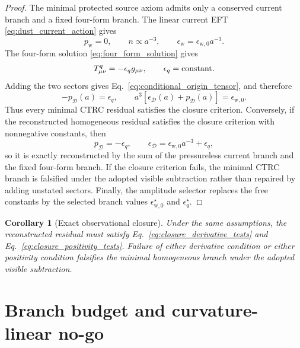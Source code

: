 \documentclass[
  aps,
  prd,
  reprint,
  superscriptaddress,
  floatfix,
  nofootinbib,
  longbibliography
]{revtex4-2}
\theoremstyle{plain}
\newtheorem{corollary}[theorem]{Corollary}
\theoremstyle{definition}
\theoremstyle{remark}
\newcommand{\D}{\mathcal D}
\newcommand{\w}{\mathrm w}
\newcommand{\eps}{\epsilon}
\begin{document}
\begin{proof}
The minimal protected source axiom admits only a conserved current branch and a
fixed four-form branch.  The linear current EFT
\eqref{eq:dust_current_action} gives
\begin{equation}
p_{\w}=0,
\qquad
n\propto a^{-3},
\qquad
\eps_{\w}=\eps_{\w,0}a^{-3}.
\end{equation}
The four-form solution \eqref{eq:four_form_solution} gives
\begin{equation}
T^q_{\mu\nu}=-\eps_q g_{\mu\nu},
\qquad
\eps_q=\hbox{constant}.
\end{equation}
Adding the two sectors gives Eq.~\eqref{eq:conditional_origin_tensor}, and
therefore
\begin{equation}
-p_\D(a)=\eps_q,
\qquad
a^3[\eps_\D(a)+p_\D(a)]=\eps_{\w,0}.
\end{equation}
Thus every minimal CTRC residual satisfies the closure criterion.
Conversely, if the reconstructed homogeneous residual satisfies the closure
criterion with nonnegative constants, then
\begin{equation}
p_\D=-\eps_q,
\qquad
\eps_\D=\eps_{\w,0}a^{-3}+\eps_q,
\end{equation}
so it is exactly reconstructed by the sum of the pressureless current branch
and the fixed four-form branch.  If the closure criterion fails, the minimal
CTRC branch is falsified under the adopted visible subtraction rather than
repaired by adding unstated sectors.  Finally, the amplitude selector replaces
the free constants by the selected branch values
\(\eps_{\w,0}^{\star}\) and \(\eps_q^{\star}\).
\end{proof}

\begin{corollary}[Exact observational closure]
Under the same assumptions, the reconstructed residual must satisfy Eq.~\eqref{eq:closure_derivative_tests} and Eq.~\eqref{eq:closure_positivity_tests}.  Failure of either derivative condition or either positivity condition falsifies the minimal homogeneous branch under the adopted visible subtraction.
\end{corollary}

\section{Branch budget and curvature-linear no-go}
\end{document}
